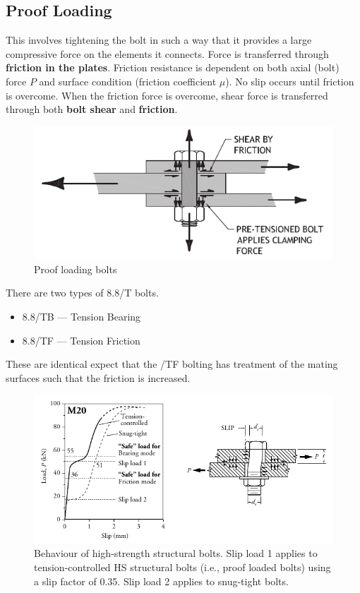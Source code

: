 \subsection{Proof Loading}
This involves tightening the bolt in such a way that it provides a large compressive force on the elements it connects. Force is transferred through \textbf{friction in the plates}. Friction resistance is dependent on both axial (bolt) force $P$ and surface condition (friction coefficient $\mu$). No slip occurs until friction is overcome. When the friction force is overcome, shear force is transferred through both \textbf{bolt shear} and \textbf{friction}.
\begin{figure}[H]
\centering
\includegraphics{PIC/CH06/PLB}
\caption{Proof loading bolts \citep{McMullin2018}}
\end{figure}

There are two types of 8.8/T bolts.
\begin{itemize}
\item 8.8/TB --- Tension Bearing
\item 8.8/TF --- Tension Friction
\end{itemize}
These are identical expect that the /TF bolting has treatment of the mating surfaces such that the friction is increased.
\begin{figure}[H]
\centering
\includegraphics[width=14cm]{PIC/CH06/BLC}
\caption{Behaviour of high-strength structural bolts. Slip load 1 applies to tension-controlled HS structural bolts (i.e., proof loaded bolts) using a slip factor of 0.35. Slip load 2 applies to snug-tight bolts. \citep{Gorenc2015}}
\end{figure}
